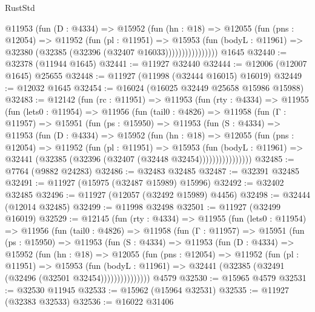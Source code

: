 \begin{lexlean}{RustStd}
\begin{coremodule}
                  @11953
                    (fun (D : @4334) =>
                    @15952
                      (fun (hn : @18) =>
                      @12055
                        (fun (pns : @12054) =>
                        @11952
                          (fun (pl : @11951) =>
                          @15953
                            (fun (bodyL : @11961) =>
                            @32380 (@32385 (@32396 (@32407 @16033))))))))))))))))
    @1645
@32440 := @32378 (@11944 @1645)
@32441 := @11927 @32440
@32444 := @12006 (@12007 @1645) @25655
@32448 := @11927 (@11998 (@32444 @16015) @16019)
@32449 := @12032 @1645
@32454 := @16024 (@16025 @32449 @25658 @15986 @15988)
@32483 := @12142
    (fun (rc : @11951) =>
    @11953
      (fun (rty : @4334) =>
      @11955
        (fun (lets0 : @11954) =>
        @11956
          (fun (tail0 : @4826) =>
          @11958
            (fun (Γ : @11957) =>
            @15951
              (fun (ps : @15950) =>
              @11953
                (fun (S : @4334) =>
                @11953
                  (fun (D : @4334) =>
                  @15952
                    (fun (hn : @18) =>
                    @12055
                      (fun (pns : @12054) =>
                      @11952
                        (fun (pl : @11951) =>
                        @15953
                          (fun (bodyL : @11961) =>
                          @32441 (@32385 (@32396 (@32407 (@32448 @32454))))))))))))))))
@32485 := @7764 (@9882 @24283)
@32486 := @32483 @32485
@32487 := @32391 @32485
@32491 := @11927 (@15975 (@32487 @15989) @15996)
@32492 := @32402 @32485
@32496 := @11927 (@12057 (@32492 @15989) @4456)
@32498 := @32444 (@12014 @32485)
@32499 := @11998 @32498
@32501 := @11927 (@32499 @16019)
@32529 := @12145
    (fun (rty : @4334) =>
    @11955
      (fun (lets0 : @11954) =>
      @11956
        (fun (tail0 : @4826) =>
        @11958
          (fun (Γ : @11957) =>
          @15951
            (fun (ps : @15950) =>
            @11953
              (fun (S : @4334) =>
              @11953
                (fun (D : @4334) =>
                @15952
                  (fun (hn : @18) =>
                  @12055
                    (fun (pns : @12054) =>
                    @11952
                      (fun (pl : @11951) =>
                      @15953
                        (fun (bodyL : @11961) =>
                        @32441 (@32385 (@32491 (@32496 (@32501 @32454)))))))))))))))
    @4579
@32530 := @15965 @4579
@32531 := @32530 @11945
@32533 := @15962 (@15964 @32531)
@32535 := @11927 (@32383 @32533)
@32536 := @16022 @31406

\end{coremodule}
\end{lexlean}
